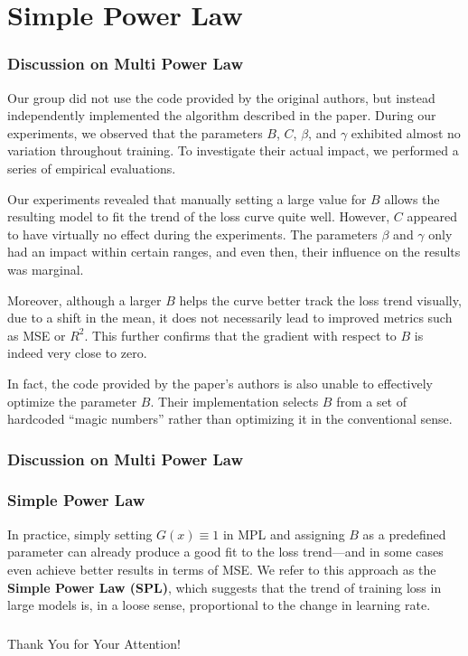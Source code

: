 \documentclass[aspectratio=169]{beamer}
\begin{document}
    \section{Simple Power Law}\label{sec:simplepowerlaw}

    \begin{frame}
        \frametitle{Discussion on Multi Power Law}
        Our group did not use the code provided by the original authors, but instead independently implemented the algorithm described in the paper.
        During our experiments, we observed that the parameters $B$, $C$, $\beta$, and $\gamma$ exhibited almost no variation throughout training. To investigate their actual impact, we performed a series of empirical evaluations.

        Our experiments revealed that manually setting a large value for $B$ allows the resulting model to fit the trend of the loss curve quite well. However, $C$ appeared to have virtually no effect during the experiments. The parameters $\beta$ and $\gamma$ only had an impact within certain ranges, and even then, their influence on the results was marginal.

        Moreover, although a larger $B$ helps the curve better track the loss trend visually, due to a shift in the mean, it does not necessarily lead to improved metrics such as MSE or $R^2$. This further confirms that the gradient with respect to $B$ is indeed very close to zero.

        In fact, the code provided by the paper’s authors is also unable to effectively optimize the parameter $B$. Their implementation selects $B$ from a set of hardcoded ``magic numbers'' rather than optimizing it in the conventional sense.
    \end{frame}
    \begin{frame}
        \frametitle{Discussion on Multi Power Law}
    \end{frame}
    \begin{frame}
        \frametitle{Simple Power Law}
        In practice, simply setting $G(x) \equiv 1$ in MPL and assigning $B$ as a predefined parameter can already produce a good fit to the loss trend—and in some cases even achieve better results in terms of MSE. We refer to this approach as the \textbf{Simple Power Law (SPL)}, which suggests that the trend of training loss in large models is, in a loose sense, proportional to the change in learning rate.
    \end{frame}

    \begin{frame}
        \frametitle{}
        \begin{center}
            \Huge Thank You for Your Attention!
        \end{center}
    \end{frame}
\end{document}
